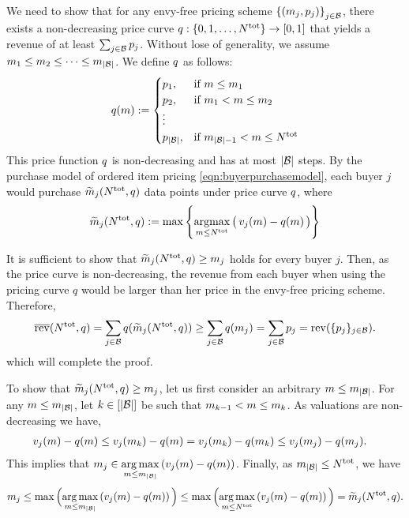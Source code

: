 We need to show that for any envy-free pricing scheme \(\left\{(m_j, p_j)\right\}_{j \in \mathcal{B}}\), there exists a non-decreasing price curve \(q : \{0,1,\dots,N^{\rm tot}\} \rightarrow [0, 1]\) that yields a revenue of at least $\sum_{j \in \mathcal{B}} p_j$.
%
Without lose of generality, we assume $m_1 \leq m_2 \leq \dots \leq m_{|\mathcal{B}|}$. We define \(q\) as follows:
\begin{align*}
    {q}(m) :=
    \begin{cases}
        p_{1}, & \text{if } m \leq m_1 \\
        p_{2}, & \text{if } m_1 < m \leq m_2 \\
        \vdots \\
        p_{|\mathcal{B}|}, & \text{if } m_{|\mathcal{B}| - 1} < m \leq N^{\rm tot}
    \end{cases}
\end{align*}
This price function \(q\) is non-decreasing and has at most $|\mathcal{B}|$ steps. By the purchase model of ordered item pricing \eqref{eqn:buyerpurchasemodel}, each buyer $j$ would purchase $\widetilde{m}_{j}(N^{\rm tot}, q)$ data points under price curve $q$, where
\[\widetilde{m}_{j}(N^{\rm tot}, q) :=
\max\left\{\mathop{\mathrm{argmax}}_{m\leq N^{\rm tot}}
\big(\,v_{j}(m) - q(m) \,\big)\right\}\]


It is sufficient to show that $\widetilde{m}_{j}(N^{\rm tot}, q) \geq m_j$  holds for every buyer $j$. 
Then, as the price curve is non-decreasing,
the revenue from each buyer when using the pricing curve $q$ would be larger than her price in the envy-free pricing scheme. Therefore,
\[
\overline{\mathrm{rev}}(N^{\rm tot}, q) = \sum_{j \in \mathcal{B}}  q(\widetilde{m}_{j}(N^{\rm tot}, q)) \geq
\sum_{j \in \mathcal{B}}q(m_j) = \sum_{j \in \mathcal{B}}p_j   = \mathrm{rev}(\{p_j\}_{j\in\mathcal{B}}).
\]
which will complete the proof.

To show that $\widetilde{m}_{j}(N^{\rm tot}, q) \geq m_j$,
let us first consider an arbitrary \(m \leq m_{|\mathcal{B}|} \). For any \(m \leq m_{|\mathcal{B}|} \), let \(k \in [|\mathcal{B}|]\) be such that \(m_{k-1} < m \leq m_{k}\). 
As valuations are non-decreasing we have,
\begin{align*}
    v_j(m) - q(m) &\leq v_j(m_{k}) - q(m)
    = v_j(m_{k}) - q(m_{k}) 
    \leq v_j(m_{j}) - q(m_{j}).
\end{align*}
This implies that $m_j \in \underset{m \leq m_{|\mathcal{B}|}  }{\arg\max} \left( v_j(m) - q(m) \right) $. 
Finally, as $m_{|\mathcal{B}|} \leq N^{\rm tot}$,  we have
\vspace{-0.1in}
\[
m_j \leq \max\Big(\underset{m \leq m_{|\mathcal{B}|}  }{\arg\max} \left( v_j(m) - q(m) \right)\Big) \leq \max \Big(\underset{m \leq N^{\rm tot}}{\arg\max} \left( v_j(m) - q(m) \right) \Big)
= \widetilde{m}_{j}(N^{\rm tot}, q).
\]

